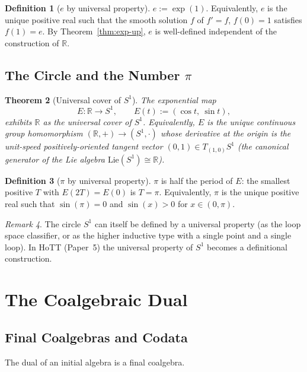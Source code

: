 \documentclass[12pt]{article}
\newtheorem{theorem}{Theorem}[section]
\theoremstyle{definition}
\newtheorem{definition}[theorem]{Definition}
\theoremstyle{remark}
\newtheorem{remark}[theorem]{Remark}
\newcommand{\R}{\mathbb{R}}
\begin{document}
\begin{definition}[$e$ by universal property]
$e := \exp(1)$. Equivalently, $e$ is the unique positive real such that the smooth solution $f$ of $f' = f$, $f(0) = 1$ satisfies $f(1) = e$. By Theorem~\ref{thm:exp-up}, $e$ is well-defined independent of the construction of $\R$.
\end{definition}

\subsection{The Circle and the Number \texorpdfstring{$\pi$}{pi}}

\begin{theorem}[Universal cover of $S^1$]
\label{thm:S1-cover}
The exponential map
\[
E \colon \R \to S^1, \qquad E(t) := (\cos t,\ \sin t),
\]
exhibits $\R$ as the universal cover of $S^1$. Equivalently, $E$ is the unique continuous group homomorphism $(\R, +) \to (S^1, \cdot)$ whose derivative at the origin is the unit-speed positively-oriented tangent vector $(0, 1) \in T_{(1,0)} S^1$ (the canonical generator of the Lie algebra $\mathrm{Lie}(S^1) \cong \R$).
\end{theorem}

\begin{definition}[$\pi$ by universal property]
\label{def:pi}
$\pi$ is half the period of $E$: the smallest positive $T$ with $E(2T) = E(0)$ is $T = \pi$. Equivalently, $\pi$ is the unique positive real such that $\sin(\pi) = 0$ and $\sin(x) > 0$ for $x \in (0, \pi)$.
\end{definition}

\begin{remark}
The circle $S^1$ can itself be defined by a universal property (as the loop space classifier, or as the higher inductive type with a single point and a single loop). In HoTT (Paper~5) the universal property of $S^1$ becomes a definitional construction.
\end{remark}

\section{The Coalgebraic Dual}
\label{sec:coalgebra}

\subsection{Final Coalgebras and Codata}

The dual of an initial algebra is a final coalgebra.
\end{document}
